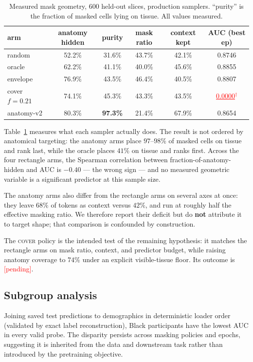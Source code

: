\documentclass{article}
\newcommand{\ph}[1]{\textcolor{red}{\underline{#1}$^{\dagger}$}}
\newcommand{\phtext}[1]{\textcolor{red}{[#1]}}
\begin{document}
\begin{table}[t]
\centering
\caption{Measured mask geometry, 600 held-out slices, production samplers.
``purity'' is the fraction of masked cells lying on tissue. All values measured.}
\label{tab:geom}
\small
\begin{tabular}{lccccc}
\toprule
arm & anatomy hidden & purity & mask ratio & context kept & AUC (best ep) \\
\midrule
random           & 52.2\% & 31.6\% & 43.7\% & 42.1\% & 0.8746 \\
oracle           & 62.2\% & 41.1\% & 40.0\% & 45.6\% & 0.8855 \\
envelope         & 76.9\% & 43.5\% & 46.4\% & 40.5\% & 0.8807 \\
cover $f{=}0.21$ & 74.1\% & 45.3\% & 43.3\% & 43.5\% & \ph{0.0000} \\
anatomy-v2       & 80.3\% & \textbf{97.3\%} & 21.4\% & 67.9\% & 0.8654 \\
\bottomrule
\end{tabular}
\end{table}

Table~\ref{tab:geom} measures what each sampler actually does. The result is not
ordered by anatomical targeting: the anatomy arms place $97$--$98\%$ of masked
cells on tissue and rank last, while the oracle places $41\%$ on tissue and
ranks first. Across the four rectangle arms, the Spearman correlation between
fraction-of-anatomy-hidden and AUC is $-0.40$ --- the wrong sign --- and no
measured geometric variable is a significant predictor at this sample size.

The anatomy arms also differ from the rectangle arms on several axes at once:
they leave $68\%$ of tokens as context versus $42\%$, and run at roughly half the
effective masking ratio. We therefore report their deficit but do \textbf{not}
attribute it to target shape; that comparison is confounded by construction.

The \textsc{cover} policy is the intended test of the remaining hypothesis: it
matches the rectangle arms on mask ratio, context, and predictor budget, while
raising anatomy coverage to $74\%$ under an explicit visible-tissue floor. Its
outcome is \phtext{pending}.

\subsection{Subgroup analysis}

Joining saved test predictions to demographics in deterministic loader order
(validated by exact label reconstruction), Black participants have the lowest
AUC in every valid probe. The disparity persists across masking policies and
epochs, suggesting it is inherited from the data and downstream task rather than
introduced by the pretraining objective.
\end{document}
